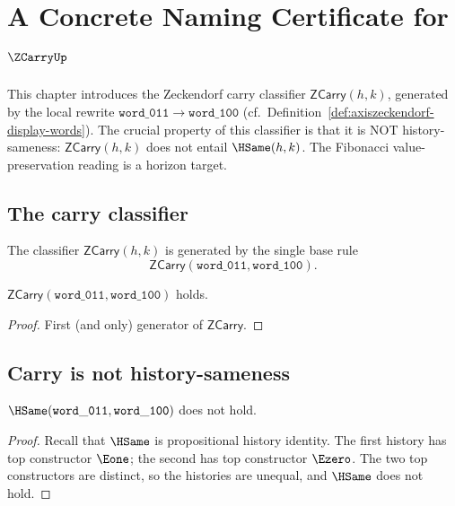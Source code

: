 \chapter{A Concrete Naming Certificate for \(\ZCarryUp\)}
\label{ch:concrete-instances-zeckendorf-carry-classifier}

This chapter introduces the Zeckendorf carry classifier \(\mathsf{ZCarry}(h, k)\), generated by the local rewrite \(\mathtt{word\_011} \to \mathtt{word\_100}\) (cf.~Definition~\ref{def:axiszeckendorf-display-words}). The crucial property of this classifier is that it is NOT history-sameness: \(\mathsf{ZCarry}(h, k)\) does not entail \(\HSame(h, k)\). The Fibonacci value-preservation reading is a horizon target.

\section{The carry classifier}

\begin{definition}
\label{def:zeckendorf-carry-classifier}
The classifier \(\mathsf{ZCarry}(h, k)\) is generated by the single base rule
$$
  \mathsf{ZCarry}(\mathtt{word\_011}, \mathtt{word\_100}).
$$
\end{definition}

\begin{lemma}
\label{lem:zcarry-011-100}
\(\mathsf{ZCarry}(\mathtt{word\_011}, \mathtt{word\_100})\) holds.
\end{lemma}
\begin{proof}
First (and only) generator of \(\mathsf{ZCarry}\).
\end{proof}

\section{Carry is not history-sameness}

\begin{theorem}
\label{thm:zcarry-011-100-not-hsame}
\(\HSame(\mathtt{word\_011}, \mathtt{word\_100})\) does not hold.
\end{theorem}
\begin{proof}
Recall that \(\HSame\) is propositional history identity. The first history has top constructor \(\Eone\); the second has top constructor \(\Ezero\). The two top constructors are distinct, so the histories are unequal, and \(\HSame\) does not hold.
\end{proof}

